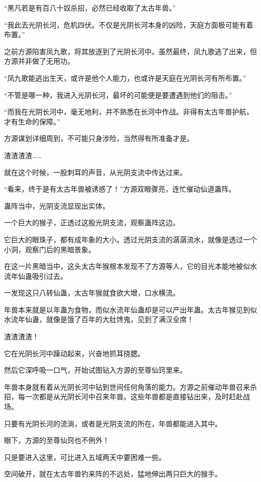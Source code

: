 \begin{this_body}
“黑凡若是有百八十奴杀招，必然已经收取了太古年兽。”

“我此去光阴长河，危机四伏。不仅是光阴长河本身的凶险，天庭方面极可能有着布置。”

之前方源陷害凤九歌，将其放逐到了光阴长河中。虽然最终，凤九歌逃了出来，但方源并非做了无用功。

“凤九歌能逃出生天，或许是他个人能力，也或许是天庭在光阴长河有所布置。”

“不管是哪一种，我进入光阴长河，最坏的可能便是要遭遇到他们的阻击。”

“而我在光阴长河中，毫无地利，并不熟悉在长河中作战。非得有太古年兽护航，才有生命的保障。”

方源谋划详细周到，不可能只身涉险，当然得有所准备才是。

渣渣渣渣……

就在这个时候，一股刺耳的声音，从光阴支流中传达过来。

“看来，终于是有太古年兽被诱惑了！”方源双眼骤亮，连忙催动仙道蛊阵。

蛊阵当中，光阴支流显现出实体。

一个巨大的猴子，正透过这股光阴支流，观察蛊阵这边。

它巨大的眼珠子，都有成年象的大小。透过光阴支流的潺潺流水，就像是透过一个小洞，观察门后的黑暗景象。

在这一片黑暗当中，这头太古年猴根本发现不了方源等人，它的目光本能地被似水流年仙蛊吸引过去。

一发现这只八转仙蛊，太古年猴就食欲大增，口水横流。

年兽本来就是以年蛊为食物，而似水流年仙蛊却是可以产出年蛊。太古年猴见到似水流年仙蛊，就像是饿了百年的大肚馋鬼，见到了满汉全席！

渣渣渣渣！

它在光阴长河中躁动起来，兴奋地抓耳挠腮。

然后它深呼吸一口气，开始试图钻入方源的至尊仙窍里来。

年兽本身就有着从光阴长河中钻到世间任何角落的能力。方源之前催动年兽召来杀招，每一次都是从光阴长河中召来年兽。这些年兽都是直接钻出来，及时赶赴战场。

只要有光阴长河的流淌，或者是光阴支流的所在，年兽都能进入其中。

眼下，方源的至尊仙窍也不例外！

只是要进入这里，可比进入五域两天中要困难一些。

空间破开，就在太古年兽钓来阵的不远处，猛地伸出两只巨大的猴手。


\end{this_body}
